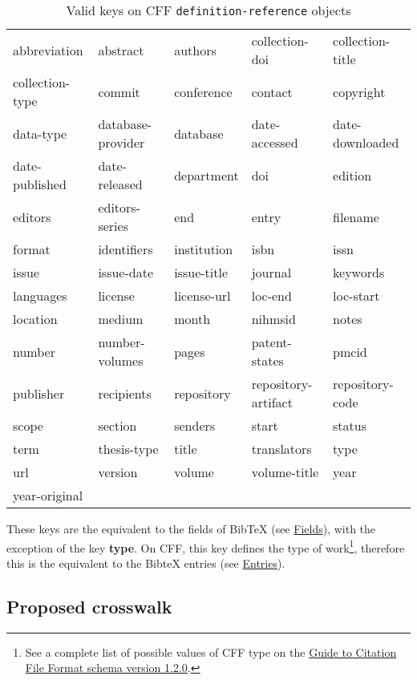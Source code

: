 \documentclass[
]{article}
\begin{document}
\begin{longtable}[]{@{}lllll@{}}
\caption{Valid keys on CFF \texttt{definition-reference}
objects}\tabularnewline
\toprule
\endhead
abbreviation & abstract & authors & collection-doi & collection-title \\
collection-type & commit & conference & contact & copyright \\
data-type & database-provider & database & date-accessed &
date-downloaded \\
date-published & date-released & department & doi & edition \\
editors & editors-series & end & entry & filename \\
format & identifiers & institution & isbn & issn \\
issue & issue-date & issue-title & journal & keywords \\
languages & license & license-url & loc-end & loc-start \\
location & medium & month & nihmsid & notes \\
number & number-volumes & pages & patent-states & pmcid \\
publisher & recipients & repository & repository-artifact &
repository-code \\
scope & section & senders & start & status \\
term & thesis-type & title & translators & type \\
url & version & volume & volume-title & year \\
year-original & & & & \\
\bottomrule
\end{longtable}

These keys are the equivalent to the fields of BibTeX (see
\protect\hyperlink{fields}{Fields}), with the exception of the key
\textbf{type}. On CFF, this key defines the type of work\footnote{See a
  complete list of possible values of CFF type on the
  \href{https://github.com/citation-file-format/citation-file-format/blob/main/schema-guide.md\#definitionsreferencetype}{Guide
  to Citation File Format schema version 1.2.0}.}, therefore this is the
equivalent to the BibteX entries (see
\protect\hyperlink{entries}{Entries}).

\hypertarget{proposed-crosswalk}{%
\subsection{Proposed crosswalk}\label{proposed-crosswalk}}
\end{document}
